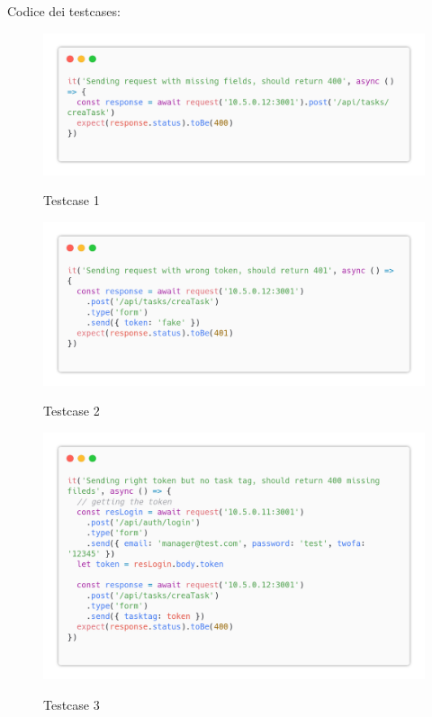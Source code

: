 \documentclass{report}
\begin{document}
Codice dei testcases:

\begin{figure}[H]
	\centering\includegraphics[width=1\textwidth]{images/code_crea_task_test1.png}
	
	Testcase 1
\end{figure}
\begin{figure}[H]
	\centering\includegraphics[width=1\textwidth]{images/code_crea_task_test2.png}
	
	Testcase 2
\end{figure}
\begin{figure}[H]
	\centering\includegraphics[width=1\textwidth]{images/code_crea_task_test3.png}
	
	Testcase 3
\end{figure}
\end{document}
